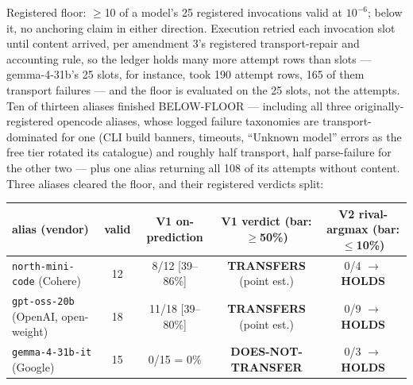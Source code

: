 Registered floor: $\ge$10 of a model's 25 registered invocations valid at $10^{-6}$; below it, no
anchoring claim in either direction. Execution retried each invocation slot until content
arrived, per amendment 3's registered transport-repair and accounting rule, so the ledger
holds many more attempt rows than slots --- gemma-4-31b's 25 slots, for instance, took 190
attempt rows, 165 of them transport failures --- and the floor is evaluated on the 25 slots,
not the attempts. Ten of thirteen aliases finished BELOW-FLOOR --- including all three
originally-registered opencode aliases, whose logged failure taxonomies are
transport-dominated for one (CLI build banners, timeouts, ``Unknown model'' errors as the
free tier rotated its catalogue) and roughly half transport, half parse-failure for the
other two --- plus one alias returning all 108 of its attempts without content. Three aliases
cleared the floor, and their registered verdicts split:

\begin{center}
\footnotesize
\setlength{\tabcolsep}{3.5pt}
\begin{tabular}{@{}lcccc@{}}
\toprule
alias (vendor) & valid & V1 on-prediction & V1 verdict (bar: $\ge$50\%) & V2 rival-argmax (bar: $\le$10\%) \\
\midrule
\texttt{north-mini-code} (Cohere) & 12 & 8/12 [39--86\%] & \textbf{TRANSFERS} (point est.) & 0/4 $\rightarrow$ \textbf{HOLDS} \\
\texttt{gpt-oss-20b} (OpenAI, open-weight) & 18 & 11/18 [39--80\%] & \textbf{TRANSFERS} (point est.) & 0/9 $\rightarrow$ \textbf{HOLDS} \\
\texttt{gemma-4-31b-it} (Google) & 15 & 0/15 = 0\% & \textbf{DOES-NOT-TRANSFER} & 0/3 $\rightarrow$ \textbf{HOLDS} \\
\bottomrule
\end{tabular}
\end{center}

